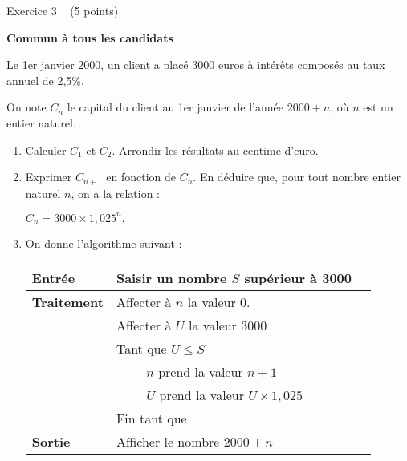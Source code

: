 
%
\begin{h2}Exercice 3   (5 points)\end{h2}
\textbf{Commun à tous les candidats}
\par
Le 1er janvier 2000, un client a placé 3000 euros à intérêts composés au taux annuel de 2,5\%.
\par
On note $C_{n}$ le  capital du client au 1er janvier de l'année $2000+n$, où $n$ est un entier naturel.
\begin{enumerate}
     \item
     Calculer $C_{1}$ et $C_{2}$. Arrondir les résultats au centime d'euro.
     \item
     Exprimer $C_{n+1}$ en fonction de $C_{n}$. En déduire que, pour tout nombre entier naturel $n$, on a la relation :
     \par
     $C_{n}=3000 \times  1,025^{n}.$
     \item
     On donne l'algorithme suivant :

     \begin{tabularx}{0.8\linewidth}{|*{3}{>{\centering \arraybackslash }X|}}%
          \hline
          \textbf{Entrée} &  Saisir un nombre $S$ supérieur à 3000
          \\ \hline
          \textbf{Traitement} &  Affecter à $n$ la valeur $0$.
          \\ \hline
          & Affecter à $U$ la valeur 3000
          \\ \hline
          & Tant que $U\leqslant S$
          \\ \hline
          &  $\qquad$   $n$ prend la valeur $n+1$
          \\ \hline
          &     $\qquad$  $U$ prend la valeur $U \times  1,025$
          \\ \hline
          & Fin tant que
          \\ \hline
          \textbf{Sortie} & Afficher le nombre $2000+n$
          \\ \hline
     \end{tabularx}


\end{enumerate}
